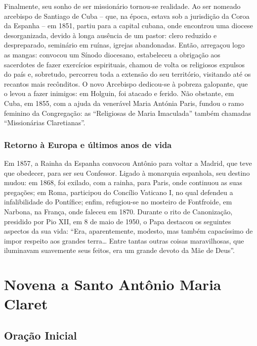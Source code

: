 \documentclass[a4paper,14pt]{extarticle} \usepackage[utf8]{inputenc}
\begin{document}
Finalmente, seu sonho de ser missionário tornou-se realidade. Ao ser nomeado arcebispo de Santiago de Cuba – que, na época, estava sob a jurisdição da Coroa da Espanha – em 1851, partiu para a capital cubana, onde encontrou uma diocese desorganizada, devido à longa ausência de um pastor: clero reduzido e despreparado, seminário em ruínas, igrejas abandonadas. Então, arregaçou logo as mangas: convocou um Sínodo diocesano, estabeleceu a obrigação aos sacerdotes de fazer exercícios espirituais, chamou de volta os religiosos expulsos do país e, sobretudo, percorreu toda a extensão do seu território, visitando até os recantos mais recônditos. O novo Arcebispo dedicou-se à pobreza galopante, que o levou a fazer inimigos: em Holguin, foi atacado e ferido. Não obstante, em Cuba, em 1855, com a ajuda da venerável Maria Antónia Paris, fundou o ramo feminino da Congregação: as “Religiosas de Maria Imaculada” também chamadas “Missionárias Claretianas”.

\subsubsection{Retorno à Europa e últimos anos de vida}

Em 1857, a Rainha da Espanha convocou Antônio para voltar a Madrid, que teve que obedecer, para ser seu Confessor. Ligado à monarquia espanhola, seu destino mudou: em 1868, foi exilado, com a rainha, para Paris, onde continuou as suas pregações; em Roma, participou do Concílio Vaticano I, no qual defendeu a infalibilidade do Pontífice; enfim, refugiou-se no mosteiro de Fontfroide, em Narbona, na França, onde faleceu em 1870. Durante o rito de Canonização, presidido por Pio XII, em 8 de maio de 1950, o Papa destacou os seguintes aspectos da sua vida: “Era, aparentemente, modesto, mas também capacíssimo de impor respeito aos grandes terra… Entre tantas outras coisas maravilhosas, que iluminavam suavemente seus feitos, era um grande devoto da Mãe de Deus”.


\newpage

\section{Novena a Santo Antônio Maria Claret}

\subsection{Oração Inicial} \label{oracao-inicial}
\end{document}
